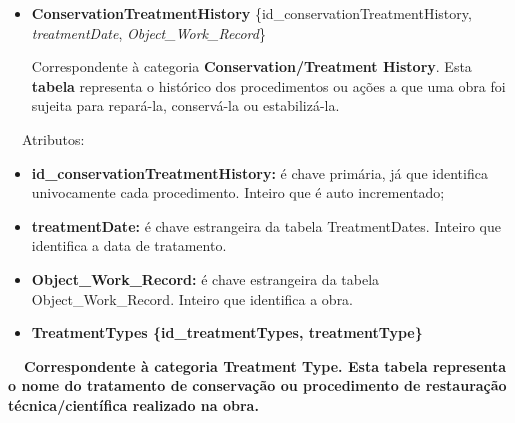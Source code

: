 \documentclass[letterpaper]{article}
\newcommand\textstyleStrongEmphasis[1]{\textbf{#1}}
\newcommand\liststyleLi{%
\renewcommand\labelitemi{{\textbullet}}
\renewcommand\labelitemii{[27A2?]}
\renewcommand\labelitemiii{{\textbullet}}
\renewcommand\labelitemiv{{\textbullet}}
}
\newcommand\liststyleLviii{%
\renewcommand\labelitemi{[27A2?]}
\renewcommand\labelitemii{[27A2?]}
\renewcommand\labelitemiii{[27A2?]}
\renewcommand\labelitemiv{[27A2?]}
}
\begin{document}
\bigskip

\liststyleLi
\begin{itemize}
\item {
\textbf{ConservationTreatmentHistory}
\{id\_conservationTreatmentHistory, \textit{treatmentDate},
\textit{Object\_Work\_Record}\}}

\foreignlanguage{english}{Correspondente \`a categoria
}\foreignlanguage{english}{\textbf{Conservation}}\textstyleStrongEmphasis{\foreignlanguage{english}{/Treatment
History}}\foreignlanguage{english}{. Esta
}\textstyleStrongEmphasis{\foreignlanguage{english}{\textmd{tabela}}}\foreignlanguage{english}{
representa o hist\'orico dos procedimentos ou a\c{c}\~oes a que uma
obra foi sujeita para repar\'a-la, conserv\'a-la ou estabiliz\'a-la.}
\end{itemize}

\bigskip

{
\ \ Atributos:}

\liststyleLviii
\begin{itemize}
\item {
\textbf{id\_conservationTreatmentHistory:} \'e chave prim\'aria, j\'a
que identifica univocamente cada procedimento. Inteiro que \'e auto
incrementado;}
\item {
\textbf{treatmentDate:} \'e chave estrangeira da tabela TreatmentDates.
Inteiro que identifica a data de tratamento.}
\item {
\textbf{Object\_Work\_Record:} \'e chave estrangeira da tabela
Object\_Work\_Record. Inteiro que identifica a obra.}


\bigskip
\end{itemize}
\liststyleLi
\begin{itemize}
\item {\bfseries
TreatmentTypes\textmd{ \{}\textmd{id\_treatmentTypes}\textmd{,
treatmentType\}}}
\end{itemize}
{\bfseries
\foreignlanguage{english}{\textmd{\ \ Correspondente \`a categoria
}}\textstyleStrongEmphasis{\foreignlanguage{english}{Treatment
Type}}\foreignlanguage{english}{\textmd{. Esta
}}\textstyleStrongEmphasis{\foreignlanguage{english}{\textmd{tabela}}}\foreignlanguage{english}{\textmd{
representa o nome do tratamento de conserva\c{c}\~ao ou procedimento de
restaura\c{c}\~ao t\'ecnica/cient\'ifica realizado na obra.}}}


\bigskip
\end{document}
